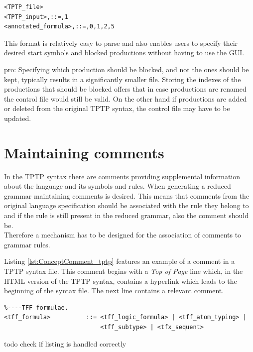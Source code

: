 \begin{lstlisting}[caption= Control file,label= lst:ConceptControlFile]
<TPTP_file>
<TPTP_input>,::=,1
<annotated_formula>,::=,0,1,2,5
\end{lstlisting}
This format is relatively easy to parse and also enables users to specify their desired start symbols and blocked productions without having to use the GUI.

pro: Specifying which production should be blocked, and not the ones should be kept, typically results in a significantly smaller file.
Storing the indexes of the productions that should be blocked offers that in case productions are renamed the control file would still be valid. On the other hand if productions are added or deleted from the original \ac{TPTP} syntax, the control file may have to be updated.

\section{Maintaining comments}\label{sec:ConceptMaintainingComments}
In the \ac{TPTP} syntax there are comments providing supplemental information about the language and its symbols and rules.
When generating a reduced grammar maintaining comments is desired. This means that comments from the original language specification should be associated with the rule they belong to and if the rule is still present in the reduced grammar, also the comment should be.\\
Therefore a mechanism has to be designed for the association of comments to grammar rules.

Listing \ref{lst:ConceptComment_tptp} features an example of a comment in a \ac{TPTP} syntax file. This comment begins with a \textit{Top of Page} line which, in the HTML version of the \ac{TPTP} syntax, contains a hyperlink which leads to the beginning of the syntax file.
The next line contains a relevant comment.\\
\begin{lstlisting}[language=none, basicstyle=\scriptsize	,caption= Comment in the \ac{TPTP} syntax,label= lst:ConceptComment_tptp]
%----Top of Page---------------------------------------------------------------
%----TFF formulae.
<tff_formula>          ::= <tff_logic_formula> | <tff_atom_typing> |
                           <tff_subtype> | <tfx_sequent>
\end{lstlisting}
todo check if listing is handled correctly

